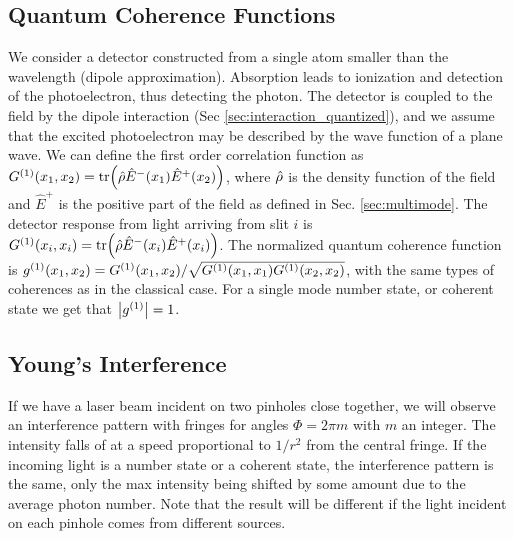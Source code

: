 \subsection{Quantum Coherence Functions}
We consider a detector constructed from a single atom smaller than the wavelength (dipole approximation). Absorption leads to ionization and detection of the photoelectron, thus detecting the photon. The detector is coupled to the field by the dipole interaction (Sec \ref{sec:interaction_quantized}), and we assume that the excited photoelectron may be described by the wave function of a plane wave. We can define the first order correlation function as $G^{(1)}(x_1, x_2) = \tr(\hat{\rho} \hat{E}^-(x_1) \hat{E}^+(x_2))$, where $\hat{\rho}$ is the density function of the field and $\hat{E}^+$ is the positive part of the field as defined in Sec. \ref{sec:multimode}. The detector response from light arriving from slit $i$ is $G^{(1)}(x_i, x_i) =\tr(\hat{\rho} \hat{E}^-(x_i) \hat{E}^+(x_i))$. The normalized quantum coherence function is $g^{(1)}(x_1, x_2) = G^{(1)}(x_1,x_2) / \sqrt{G^{(1)}(x_1,x_1)G^{(1)}(x_2,x_2)}$, with the same types of coherences as in the classical case. For a single mode number state, or coherent state we get that $\abs{g^{(1)}} = 1$.

\subsection{Young's Interference}
If we have a laser beam incident on two pinholes close together, we will observe an interference pattern with fringes for angles $\Phi =2\pi m$ with $m$ an integer. The intensity falls of at a speed proportional to $1/r^2$ from the central fringe. If the incoming light is a number state or a coherent state, the interference pattern is the same, only the max intensity being shifted by some amount due to the average photon number. Note that the result will be different if the light incident on each pinhole comes from different sources.

